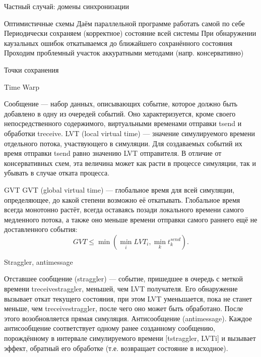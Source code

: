 \documentclass{beamer}
\begin{document}
\begin{frame}{Частный случай: домены синхронизации}
    \centering
   
\end{frame}

\begin{frame}{Оптимистичные схемы}
Даём параллельной программе работать самой по
себе
Периодически сохраняем (корректное) состояние
всей системы
При обнаружении каузальных ошибок
откатываемся до ближайшего сохранённого
состояния
Проходим проблемный участок аккуратными
методами (напр. консервативно)

\end{frame}

\begin{frame}{Точки сохранения}
\centering
 
\end{frame}

\begin{frame}{Time Warp}

Сообщение — набор данных, описывающих событие, которое
должно быть добавлено в одну из очередей событий. Оно
характеризуется, кроме своего непосредственного
содержимого, виртуальными временами отправки tsend и
обработки treceive.
LVT (local virtual time) — значение симулируемого времени
отдельного потока, участвующего в симуляции. Для
создаваемых событий их время отправки tsend равно
значению LVT отправителя. В отличие от консервативных
схем, эта величина может как расти в процессе симуляции,
так и убывать в случае отката процесса.
\end{frame}


\begin{frame}{GVT}
 GVT (global virtual time) — глобальное время для всей
симуляции, определяющее, до какой степени возможно её
откатывать. Глобальное время всегда монотонно растёт, всегда
оставаясь позади локального времени самого медленного
потока, а также оно меньше времени отправки самого раннего
ещё не доставленного события:
$$GVT \leq \min \left( \min\limits_{i} LVT_{i}, \min\limits_{k} t^{send}_k  \right).$$
\end{frame}


\begin{frame}{Straggler, antimessage}

Отставшее сообщение (straggler) — событие, пришедшее
в очередь с меткой времени treceivestraggler, меньшей,
чем LVT получателя. Его обнаружение вызывает откат
текущего состояния, при этом LVT уменьшается, пока не
станет меньше, чем treceivestraggler, после чего оно
может быть обработано. После этого возобновляется
прямая симуляция.
Антисообщение (antimessage). Каждое антисообщение
соответствует одному ранее созданному сообщению,
порождённому в интервале симулируемого времени
[tstraggler, LVTi] и вызывает эффект, обратный его
обработке (т.е. возвращает состояние в исходное).

\end{frame}
\end{document}
